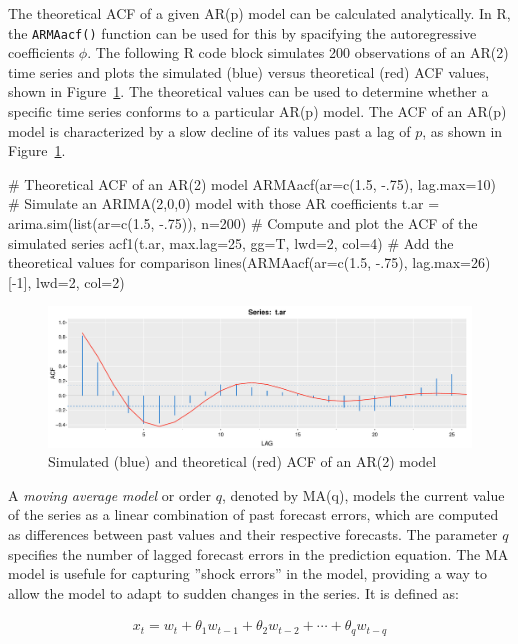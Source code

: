 The theoretical ACF of a given AR(p) model can be calculated analytically. In R, the \texttt{ARMAacf()} function can be used for this by spacifying the autoregressive coefficients $\phi$. The following R code block simulates 200 observations of an AR(2) time series and plots the simulated (blue) versus theoretical (red) ACF values, shown in Figure~\ref{fig:figure18}. The theoretical values can be used to determine whether a specific time series conforms to a particular AR(p) model. The ACF of an AR(p) model is characterized by a slow decline of its values past a lag of $p$, as shown in Figure~\ref{fig:figure18}.

\begin{samepage}
\begin{Rcode}
# Theoretical ACF of an AR(2) model
ARMAacf(ar=c(1.5, -.75), lag.max=10)
# Simulate an ARIMA(2,0,0) model with those AR coefficients
t.ar = arima.sim(list(ar=c(1.5, -.75)), n=200)
# Compute and plot the ACF of the simulated series
acf1(t.ar, max.lag=25, gg=T, lwd=2, col=4)
# Add the theoretical values for comparison
lines(ARMAacf(ar=c(1.5, -.75), lag.max=26)[-1], lwd=2, col=2)
\end{Rcode}
\end{samepage}

\begin{figure}
\centering
\includegraphics[width=.75\textwidth]{figure18.pdf}
\caption{Simulated (blue) and theoretical (red) ACF of an AR(2) model}
\label{fig:figure18}
\end{figure}

A \emph{moving average model} or order $q$, denoted by MA(q), models the current value of the series as a linear combination of past forecast errors, which are computed as differences between past values and their respective forecasts. The parameter $q$ specifies the number of lagged forecast errors in the prediction equation. The MA model is usefule for capturing ''shock errors'' in the model, providing a way to allow the model to adapt to sudden changes in the series. It is defined as: 

\begin{align*}
x_t = w_t + \theta_1 w_{t-1} + \theta_2 w_{t-2} + \cdots + \theta_q w_{t-q}
\end{align*}

